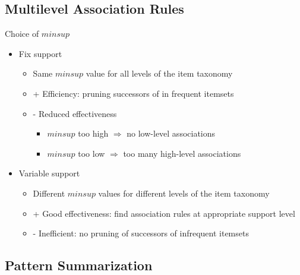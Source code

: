 \documentclass[../notes.tex]{subfiles}
\begin{document}
\subsection{Multilevel Association Rules}
Choice of $minsup$
\begin{itemize} 
  \item Fix support
  \begin{itemize} 
    \item Same $minsup$ value for all levels of the item taxonomy
    \item + Efficiency: pruning successors of in frequent itemsets
    \item - Reduced effectiveness
    \begin{itemize} 
      \item $minsup$ too high $\Rightarrow$ no low-level associations 
      \item $minsup$ too low $\Rightarrow$ too many high-level associations
    \end{itemize}
  \end{itemize}

  \item Variable support
  \begin{itemize} 
    \item Different $minsup$ values for different levels of the item taxonomy
    \item + Good effectiveness: find association rules at appropriate support level
    \item - Inefficient: no pruning of successors of infrequent itemsets
  \end{itemize}
\end{itemize}
\newpage

\subsection{Pattern Summarization}
\end{document}
